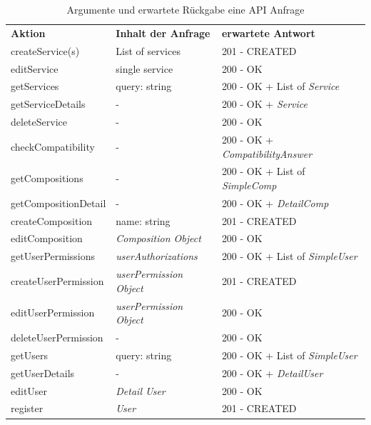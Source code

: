 \label{sec:org9044419}
\begin{table}[htbp]
\centering
\begin{tabularx}{\linewidth+20pt}{|X|l|X|}
\hline
\rowcolor[HTML]{C0C0C0}
\textbf{Aktion} & \textbf{Inhalt der Anfrage} & \textbf{erwartete Antwort} \\
\rowcolor[HTML]{E7E7E7}
createService(s) & List of services & 201 - CREATED\\
editService & single service & 200 - OK\\
\rowcolor[HTML]{E7E7E7}
getServices & query: string & 200 - OK + List of \emph{Service}\\
getServiceDetails & - & 200 - OK + \emph{Service}\\
\rowcolor[HTML]{E7E7E7}
deleteService & - & 200 - OK\\
\hline
checkCompatibility & - & 200 - OK + \emph{CompatibilityAnswer}\\
\hline
\rowcolor[HTML]{E7E7E7}
getCompositions & - & 200 - OK + List of \emph{SimpleComp}\\
getCompositionDetail & - & 200 - OK + \emph{DetailComp}\\
\rowcolor[HTML]{E7E7E7}
createComposition & name: string & 201 - CREATED\\
editComposition & \emph{Composition Object} & 200 - OK\\
\rowcolor[HTML]{E7E7E7}
\hline
getUserPermissions & \emph{userAuthorizations} & 200 - OK + List of \emph{SimpleUser}\\
createUserPermission & \emph{userPermission Object} & 201 - CREATED\\
\rowcolor[HTML]{E7E7E7}
editUserPermission & \emph{userPermission Object} & 200 - OK\\
deleteUserPermission & - & 200 - OK\\
\rowcolor[HTML]{E7E7E7}
\hline
getUsers & query: string & 200 - OK + List of \emph{SimpleUser}\\
getUserDetails & - & 200 - OK + \emph{DetailUser}\\
\rowcolor[HTML]{E7E7E7}
editUser & \emph{Detail User} & 200 - OK\\
register & \emph{User} & 201 - CREATED\\
\hline
\end{tabularx}
\caption{Argumente und erwartete Rückgabe eine API Anfrage}
\end{table}